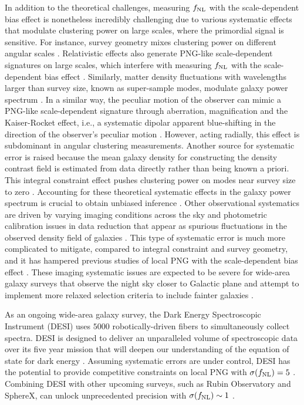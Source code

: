 In addition to the theoretical challenges, measuring $f_{\rm NL}$ with the scale-dependent bias effect is nonetheless incredibly challenging due to various systematic effects that modulate clustering power on large scales, where the primordial signal is sensitive. For instance, survey geometry mixes clustering power on different angular scales \citep{beutler2014clustering,wilson2017rapid}. Relativistic effects also generate PNG-like scale-dependent signatures on large scales, which interfere with measuring $f_{\rm NL}$ with the scale-dependent bias effect \citep{wang2020}. Similarly, matter density fluctuations with wavelengths larger than survey size, known as super-sample modes, modulate galaxy power spectrum \citep{castorina2020JCAP}. In a similar way, the peculiar motion of the observer can mimic a PNG-like scale-dependent signature through aberration, magnification and the Kaiser-Rocket effect, i.e., a systematic dipolar apparent blue-shifting in the direction of the observer's peculiar motion \citep{2021JCAP...11..027B}. However, acting radially, this effect is subdominant in angular clustering measurements. Another source for systematic error is raised because the mean galaxy density for constructing the density contrast field is estimated from data directly rather than being known a priori. This integral constraint effect pushes clustering power on modes near survey size to zero \citep{peacock1991large,de2019integral}. Accounting for these theoretical systematic effects in the galaxy power spectrum is crucial to obtain unbiased inference \citep[see, e.g.,][]{riquelme2022primordial}. Other observational systematics are driven by varying imaging conditions across the sky \citep{ross2011} and photometric calibration issues in data reduction that appear as spurious fluctuations in the observed density field of galaxies \citep{huterer2013calibration}. This type of systematic error is much more complicated to mitigate, compared to integral constraint and survey geometry, and it has hampered previous studies of local PNG with the scale-dependent bias effect \citep[see, e.g.,][]{pullen2013systematic, Ho2015JCAP...05..040H}. These imaging systematic issues are expected to be severe for wide-area galaxy surveys that observe the night sky closer to Galactic plane and attempt to implement more relaxed selection criteria to include fainter galaxies \citep[see, e.g,][]{kitanidis2020imaging}. 
 
As an ongoing wide-area galaxy survey, the Dark Energy Spectroscopic Instrument (DESI) uses $5000$ robotically-driven fibers to simultaneously collect spectra. DESI is designed to deliver an unparalleled volume of spectroscopic data over its five year mission that will deepen our understanding of the equation of state for dark energy \citep{aghamousa2016desi}. Assuming systematic errors are under control, DESI has the potential to provide competitive constraints on local PNG with $\sigma(f_{\rm NL})=5$ \citep{aghamousa2016desi}. Combining DESI with other upcoming surveys, such as Rubin Observatory and SphereX, can unlock unprecedented precision with $\sigma (f_{\rm NL}) \sim 1$ \citep[see, e.g.,][]{Heinrich2022AAS...24020203H}.
 
